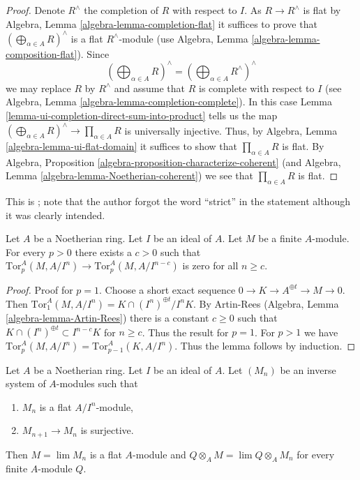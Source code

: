 \begin{proof}
Denote $R^\wedge$ the completion of $R$ with respect to $I$. As
$R \to R^\wedge$ is flat by
Algebra, Lemma \ref{algebra-lemma-completion-flat}
it suffices to prove that
$(\bigoplus\nolimits_{\alpha \in A} R)^\wedge$ is a flat
$R^\wedge$-module (use
Algebra, Lemma \ref{algebra-lemma-composition-flat}).
Since
$$
(\bigoplus\nolimits_{\alpha \in A} R)^\wedge
=
(\bigoplus\nolimits_{\alpha \in A} R^\wedge)^\wedge
$$
we may replace $R$ by $R^\wedge$ and assume that $R$ is complete with
respect to $I$ (see
Algebra, Lemma \ref{algebra-lemma-completion-complete}).
In this case
Lemma \ref{lemma-ui-completion-direct-sum-into-product}
tells us the map
$(\bigoplus\nolimits_{\alpha \in A} R)^\wedge \to \prod_{\alpha \in A} R$
is universally injective. Thus, by
Algebra, Lemma \ref{algebra-lemma-ui-flat-domain}
it suffices to show that $\prod_{\alpha \in A} R$ is flat. By
Algebra, Proposition \ref{algebra-proposition-characterize-coherent}
(and
Algebra, Lemma \ref{algebra-lemma-Noetherian-coherent})
we see that $\prod_{\alpha \in A} R$ is flat.
\end{proof}

\begin{lemma}
\label{lemma-tor-strictly-pro-zero}
\begin{reference}
This is \cite[Lemma 9.9]{quillenhomology}; note that
the author forgot the word ``strict'' in the statement
although it was clearly intended.
\end{reference}
Let $A$ be a Noetherian ring. Let $I$ be an ideal of $A$.
Let $M$ be a finite $A$-module. For every $p > 0$ there exists a $c > 0$
such that $\text{Tor}_p^A(M, A/I^n) \to \text{Tor}_p^A(M, A/I^{n - c})$
is zero for all $n \geq c$.
\end{lemma}

\begin{proof}
Proof for $p = 1$. Choose a short exact sequence
$0 \to K \to A^{\oplus t} \to M \to 0$. Then
$\text{Tor}_1^A(M, A/I^n) = K \cap (I^n)^{\oplus t}/I^nK$.
By Artin-Rees (Algebra, Lemma \ref{algebra-lemma-Artin-Rees})
there is a constant $c \geq 0$ such that
$K \cap (I^n)^{\oplus t} \subset I^{n - c}K$ for $n \geq c$. Thus the result
for $p = 1$. For $p > 1$ we have
$\text{Tor}_p^A(M, A/I^n) = \text{Tor}^A_{p - 1}(K, A/I^n)$.
Thus the lemma follows by induction.
\end{proof}

\begin{lemma}
\label{lemma-limit-flat}
Let $A$ be a Noetherian ring. Let $I$ be an ideal of $A$. Let
$(M_n)$ be an inverse system of $A$-modules such that
\begin{enumerate}
\item $M_n$ is a flat $A/I^n$-module,
\item $M_{n + 1} \to M_n$ is surjective.
\end{enumerate}
Then $M = \lim M_n$ is a flat $A$-module and
$Q \otimes_A M = \lim Q \otimes_A M_n$ for every finite $A$-module $Q$.
\end{lemma}

